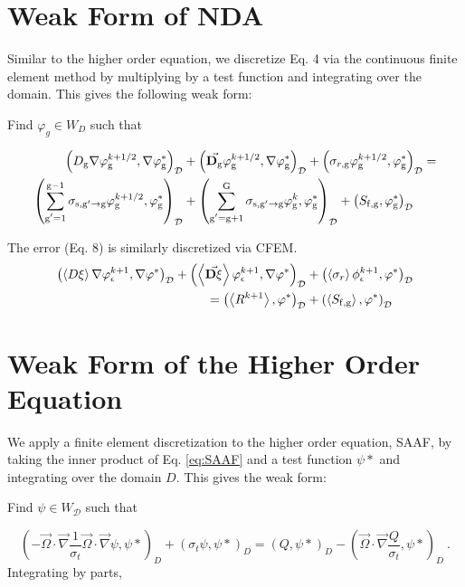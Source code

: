 \section{Weak Form of NDA}
Similar to the higher order equation, we discretize  Eq. 4 via the continuous finite element method by multiplying by a test function and integrating over the domain. This gives the following weak form:

Find $\varphi_{g} \in W_D$ such that

  \begin{align}
  \left(D_{\mathrm{g}} \nabla \varphi_{\mathrm{g}}^{k+1/2}, \nabla \varphi^*_{\mathrm{g}}\right)_\mathcal{D} &+ \left(\vec{\bf{D}_{\mathrm{g}}}\varphi_{\mathrm{g}}^{k+1/2} , \nabla \varphi^*_{\mathrm{g}}\right)_\mathcal{D} +  \left(\sigma_{r,\mathrm{g}} \varphi_{\mathrm{g}}^{k+1/2}, \varphi^*_{\mathrm{g}}\right)_\mathcal{D} = \nonumber \\
   \left(\sum\limits_{\substack{\mathrm{g}'=1}}^{\mathrm{g-1}} \sigma_{\mathrm{s},\mathrm{g}' \to\mathrm{g}}\varphi_{\mathrm{g}}^{k+1/2}, \varphi^*_{\mathrm{g}}\right)_\mathcal{D} &+ \left(\sum\limits_{\substack{\mathrm{g}'=\mathrm{g}+1}}^{\mathrm{G}} \sigma_{\mathrm{s},\mathrm{g}' \to\mathrm{g}}\varphi_{\mathrm{g}}^{k}, \varphi^*_{\mathrm{g}}\right)_\mathcal{D} 
  + \left(S_\mathrm{f,g}, \varphi^*_{\mathrm{g}}\right)_\mathcal{D}  \label{k1/2}
  \end{align}


The error (Eq. 8) is similarly discretized via CFEM.
  \begin{align}
  \left(\left< D\xi \right >\nabla \varphi_{\epsilon}^{k+1}, \nabla \varphi^* \right)_\mathcal{D} + \left(\left<\vec{\bf{D}\xi} \right>\varphi_{\epsilon}^{k+1}, \nabla \varphi^* \right)_\mathcal{D} &+ \left(\left<\sigma_r \right>\phi_{\epsilon}^{k+1}, \varphi^* \right)_\mathcal{D}  \nonumber \\= \left(\left<R^{k+1} \right>, \varphi^* \right)_\mathcal{D} &+ \left(\left<S_\mathrm{f,g} \right>, \varphi^* \right)_\mathcal{D} 
  \end{align}

\section{Weak Form of the Higher Order Equation}
We apply a finite element discretization to the higher order equation, SAAF, by taking the inner product of  Eq. \ref{eq:SAAF} and a test function $\psi*$ and integrating over the domain $D$. This gives the weak form:

Find $\psi \in W_{\mathcal D}$ such that

\begin{equation}
    \left ( -\vec{\Omega} \cdot \vec{\nabla}\frac{1}{\sigma_t}\vec{\Omega} \cdot \vec{\nabla} \psi, \psi* \right )_D + \left ( \sigma_t \psi, \psi* \right )_D = \left ( Q, \psi* \right)_D - \left ( \vec{\Omega} \cdot \vec{\nabla}\frac{Q}{\sigma_t}, \psi* \right)_D \:.
\end{equation}
Integrating by parts,

